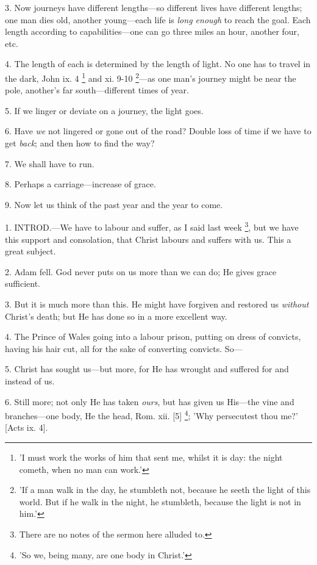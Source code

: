 3. Now journeys have different lengths—so
different lives have different lengths; one man dies old, another
young—each life is \emph{long enough} to reach the goal. Each length
according to capabilities—one can go three miles an hour, another
four, etc.

4. The length of each is determined by the length
of light. No one has to travel in the dark, John ix. 4 \footnote{'I must work the works of
him that sent me, whilst it is day: the night cometh, when no man can
work.'} and xi. 9-10 \footnote{'If a man walk in the day,
he stumbleth not, because he seeth the light of this world. But if he
walk in the night, he stumbleth, because the light is not in him.'}—as
one man's journey might be near the pole, another's far
south—different times of year.

5. If we linger or deviate on a journey, the
light goes.

6. Have \emph{we} not lingered or gone out of the
road? Double loss of time if we have to get \emph{back}; and then how
to find the way?

7. We shall have to run.

8. Perhaps a carriage—increase of grace.

9. Now let us think of the past year and the year
to come.


1. INTROD.—We
have to labour and suffer, as I said last week \footnote{There are no notes of the
sermon here alluded to.}, but we have this support and consolation, that Christ labours
and suffers with us. This a great subject.

2. Adam fell. God never puts on us more than we
can do; He gives grace sufficient.

3. But it is much more than this. He might have
forgiven and restored us \emph{without} Christ's death; but He has
done so in a more excellent way.

4. The Prince of Wales going into a labour
prison, putting on dress of convicts, having his hair cut, all for the
sake of converting convicts. So—

5. Christ has sought us—but more, for He has
wrought and suffered for and instead of us.

6. Still more; not only He has taken \emph{ours},
but has given us His—the vine and branches—one body, He the head,
Rom. xii. [5] \footnote{'So we, being many, are
one body in Christ.'}; 'Why
persecutest thou me?' [Acts ix. 4].

